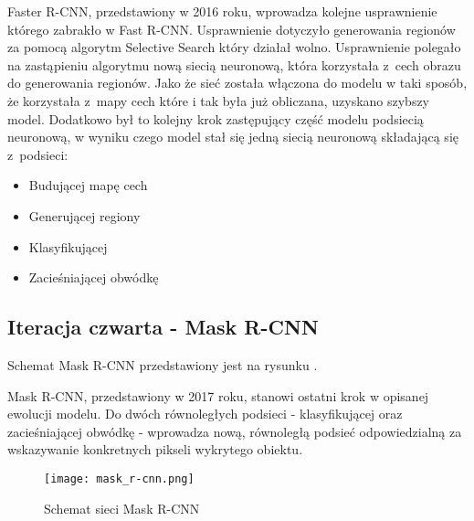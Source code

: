 
Faster R-CNN, przedstawiony w 2016 roku, wprowadza kolejne usprawnienie którego zabrakło w Fast R-CNN.
Usprawnienie dotyczyło generowania regionów za pomocą algorytm Selective Search który działał wolno.
Usprawnienie polegało na zastąpieniu algorytmu nową siecią neuronową, która korzystała z~cech obrazu do generowania regionów.
Jako że sieć została włączona do modelu w taki sposób, że korzystała z~mapy cech które i tak była już obliczana, uzyskano szybszy model.
Dodatkowo był to kolejny krok zastępujący część modelu podsiecią neuronową, w wyniku czego model stał się jedną siecią neuronową składającą się z~podsieci:

\begin{itemize}
	\item Budującej mapę cech
	\item Generującej regiony
	\item Klasyfikującej
	\item Zacieśniającej obwódkę
\end{itemize}

\subsection{Iteracja czwarta - Mask R-CNN}

Schemat Mask R-CNN przedstawiony jest na rysunku .


Mask R-CNN, przedstawiony w 2017 roku, stanowi ostatni krok w opisanej ewolucji modelu.
Do dwóch równoległych podsieci - klasyfikującej oraz zacieśniającej obwódkę - wprowadza nową, równoległą podsieć odpowiedzialną za wskazywanie konkretnych pikseli wykrytego obiektu.

\begin{figure}[h]
  \centering
  \caption{Schemat sieci Mask R-CNN}
  \texttt{[image: mask\_r-cnn.png]}
  \label{fig:mask_r_cnn}
\end{figure}
